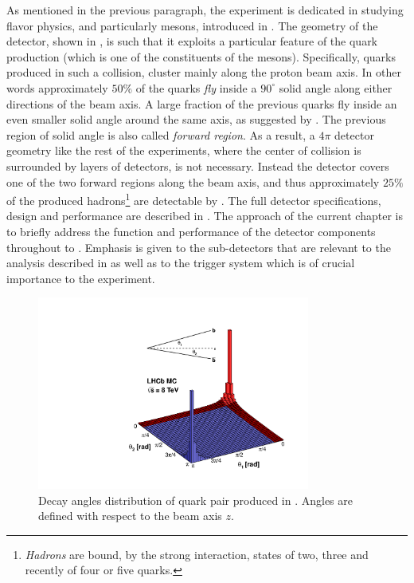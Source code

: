 As mentioned in the previous paragraph, the \lhcb experiment is dedicated in studying flavor physics,
and particularly \B mesons, introduced in . The geometry of the \lhcb detector,
shown in , is such that it exploits a particular feature of the
\bquark quark production (which is one of the constituents of the \B mesons). Specifically, \bquark quarks
produced in such a collision, cluster mainly along the proton beam axis. In other words approximately $50\%$
of the \bquark quarks {\it fly} inside a $90^\circ$ solid angle along either directions of the beam axis.
A large fraction of the previous quarks fly inside an even smaller solid angle around the same axis, as
suggested by . The previous region of solid angle is also called {\it forward region}.
As a result, a $4\pi$ detector geometry like the rest of the \lhc experiments, where the center of collision
is surrounded by layers of detectors, is not necessary. Instead the \lhcb detector covers one of the two
forward regions along the beam axis, and thus approximately $25\%$ of the produced \bquark
hadrons\footnote{ {\it Hadrons} are bound, by the strong interaction, states of two,
three and recently \cite{Aaij:2016nsc} of four or five quarks.} are detectable by \lhcb.
The full \lhcb detector specifications, design and performance are described in \cite{Aaij:2014jba}.
The approach of the current chapter is to briefly address the function and performance of the detector components
throughout  to . Emphasis is given to the sub-detectors that are relevant
to the analysis described in  as well as to the trigger system which is of crucial importance
to the \lhcb experiment.

\begin{figure}[t]
  \centering
  \includegraphics[width=0.8\textwidth, trim=0cm 0cm 0cm 2.5cm, clip=true]{Figures/Chapter2/08_rad_acc_scheme_right}
  \caption{Decay angles distribution of \bquark quark pair produced in \lhcb. Angles are defined with
           respect to the beam axis $z$.}
  \label{bb_roduction_angles}
\end{figure}
